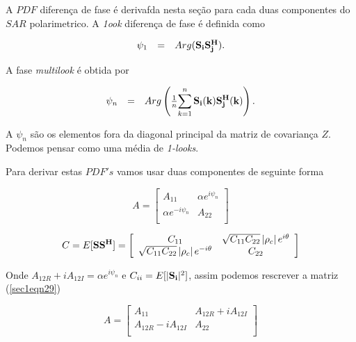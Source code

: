 \documentclass[10pt,a4paper]{article}
\begin{document}
A $PDF$ diferença de fase é derivafda nesta seção para cada duas componentes do $SAR$ polarimetrico. A {\it 1ook} diferença de fase é definida como 


\begin{equation}\label{sec1eqn27}
\begin{array}{ccc}
	\psi_1&=&Arg({\bf S_iS_j^{H}}). \\
\end{array}
\end{equation}

A fase {\it multilook} é obtida por 

\begin{equation}\label{sec1eqn28}
\begin{array}{ccc}
	\psi_n&=&Arg\left(\frac{1}{n}\displaystyle{\sum_{k=1}^{n}{\bf S_i(k)S_j^{H}(k)}}\right). \\
\end{array}
\end{equation}

A $\psi_n$ são os elementos fora da diagonal principal da matriz de covariança $Z$. Podemos pensar como uma média de {\it 1-looks}.

Para derivar estas $PDF's$ vamos usar duas componentes de seguinte forma

\begin{equation}\label{sec1eqn29}
	A=\left[
\begin{array}{cc}
	A_{11}              & \alpha e^{i\psi_n} \\
	\alpha e^{-i\psi_n} & A_{22} \\
\end{array}\right]
\end{equation}


\begin{equation}\label{sec1eqn30}
	C=E[{\bf SS^{H}}]=\left[
\begin{array}{cc}
	C_{11}              & \sqrt{C_{11}C_{22}}\left|\rho_c \right|e^{i\theta} \\
 \sqrt{C_{11}C_{22}}\left|\rho_c \right|e^{-i\theta} & C_{22}\\
\end{array}\right]
\end{equation}

Onde $A_{12R}+iA_{12I}=\alpha e^{i\psi_n}$ e $C_{ii}=E[|{\bf S_i}|^2]$, assim podemos rescrever a matriz (\ref{sec1eqn29})

\begin{equation}\label{sec1eqn31}
	A=\left[
\begin{array}{cc}
	A_{11}              & A_{12R}+iA_{12I} \\
	A_{12R}-iA_{12I}    & A_{22} \\
\end{array}\right]
\end{equation}
\end{document}
